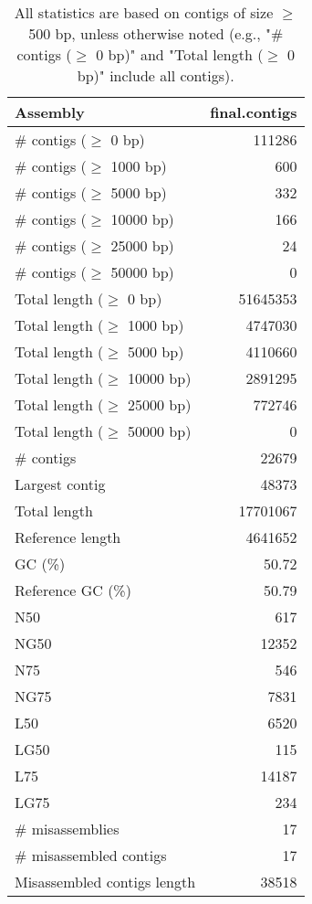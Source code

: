 \documentclass[12pt,a4paper]{article}
\begin{document}
\begin{table}[ht]
\begin{center}
\caption{All statistics are based on contigs of size $\geq$ 500 bp, unless otherwise noted (e.g., "\# contigs ($\geq$ 0 bp)" and "Total length ($\geq$ 0 bp)" include all contigs).}
\begin{tabular}{|l*{1}{|r}|}
\hline
Assembly & final.contigs \\ \hline
\# contigs ($\geq$ 0 bp) & 111286 \\ \hline
\# contigs ($\geq$ 1000 bp) & 600 \\ \hline
\# contigs ($\geq$ 5000 bp) & 332 \\ \hline
\# contigs ($\geq$ 10000 bp) & 166 \\ \hline
\# contigs ($\geq$ 25000 bp) & 24 \\ \hline
\# contigs ($\geq$ 50000 bp) & 0 \\ \hline
Total length ($\geq$ 0 bp) & 51645353 \\ \hline
Total length ($\geq$ 1000 bp) & 4747030 \\ \hline
Total length ($\geq$ 5000 bp) & 4110660 \\ \hline
Total length ($\geq$ 10000 bp) & 2891295 \\ \hline
Total length ($\geq$ 25000 bp) & 772746 \\ \hline
Total length ($\geq$ 50000 bp) & 0 \\ \hline
\# contigs & 22679 \\ \hline
Largest contig & 48373 \\ \hline
Total length & 17701067 \\ \hline
Reference length & 4641652 \\ \hline
GC (\%) & 50.72 \\ \hline
Reference GC (\%) & 50.79 \\ \hline
N50 & 617 \\ \hline
NG50 & 12352 \\ \hline
N75 & 546 \\ \hline
NG75 & 7831 \\ \hline
L50 & 6520 \\ \hline
LG50 & 115 \\ \hline
L75 & 14187 \\ \hline
LG75 & 234 \\ \hline
\# misassemblies & 17 \\ \hline
\# misassembled contigs & 17 \\ \hline
Misassembled contigs length & 38518 \\ \hline

\end{tabular}
\end{center}
\end{table}
\end{document}
